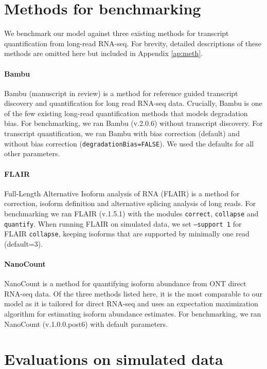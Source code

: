 \section{Methods for benchmarking}

We benchmark our model against three existing methods for transcript quantification from long-read RNA-seq. For brevity, detailed descriptions of these methods are omitted here but included in Appendix \ref{ap:meth}.

\paragraph{Bambu} Bambu (manuscript in review) \cite{Bambu2022} is a method for reference guided transcript discovery and quantification for long read RNA-seq data. Crucially, Bambu is one of the few existing long-read quantification methods that models degradation bias. For benchmarking, we ran Bambu (v.2.0.6) without transcript discovery. For transcript quantification, we ran Bambu with bias correction (default) and without bias correction (\texttt{degradationBias=FALSE}). We used the defaults for all other parameters.

\paragraph{FLAIR} Full-Length Alternative Isoform analysis of RNA (FLAIR) \cite{Tang2020} is a method for correction, isoform definition and alternative splicing analysis of long reads. For benchmarking we ran FLAIR (v.1.5.1) with the modules \texttt{correct}, \texttt{collapse} and \texttt{quantify}. When running FLAIR on simulated data, we set \texttt{--support 1} for FLAIR \texttt{collapse}, keeping isoforms that are supported by minimally one read (default=3).  

\paragraph{NanoCount} NanoCount \cite{Gleeson2021} is a method for quantifying isoform abundance from ONT direct RNA-seq data. Of the three methods listed here, it is the most comparable to our model as it is tailored for direct RNA-seq and uses an expectation maximization algorithm for estimating isoform abundance estimates. For benchmarking, we ran NanoCount (v.1.0.0.post6) with default parameters.

\section{Evaluations on simulated data}\label{sec:eval-sim}

